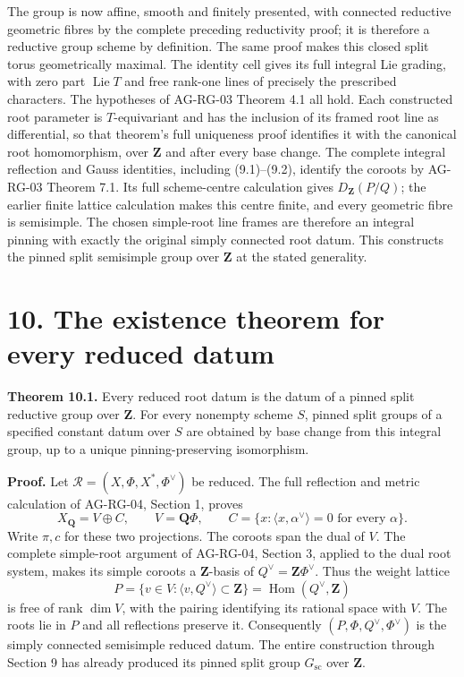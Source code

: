 \documentclass[11pt,a4paper,openany]{report}
\newcounter{none}
\begin{document}
The group is now affine, smooth and finitely presented, with connected reductive geometric fibres by the complete preceding reductivity proof; it is therefore a reductive group scheme by definition. The same proof makes this closed split torus geometrically maximal. The identity cell gives its full integral Lie grading, with zero part \(\operatorname{Lie}T\) and free rank-one lines of precisely the prescribed characters. The hypotheses of AG-RG-03 Theorem 4.1 all hold. Each constructed root parameter is \(T\)-equivariant and has the inclusion of its framed root line as differential, so that theorem's full uniqueness proof identifies it with the canonical root homomorphism, over \(\mathbf Z\) and after every base change. The complete integral reflection and Gauss identities, including (9.1)--(9.2), identify the coroots by AG-RG-03 Theorem 7.1. Its full scheme-centre calculation gives \(D_{\mathbf Z}(P/Q)\); the earlier finite lattice calculation makes this centre finite, and every geometric fibre is semisimple. The chosen simple-root line frames are therefore an integral pinning with exactly the original simply connected root datum. This constructs the pinned split semisimple group over \(\mathbf Z\) at the stated generality.

\section{10. The existence theorem for every reduced datum}\label{AG-RG-05-the-existence-theorem-for-every-reduced-datum}

\textbf{Theorem 10.1.} Every reduced root datum is the datum of a pinned split reductive group over \(\mathbf Z\). For every nonempty scheme \(S\), pinned split groups of a specified constant datum over \(S\) are obtained by base change from this integral group, up to a unique pinning-preserving isomorphism.

\textbf{Proof.} Let \(\mathcal R=(X,\Phi,X^*,\Phi^\vee)\) be reduced. The full reflection and metric calculation of AG-RG-04, Section 1, proves \[
 X_{\mathbf Q}=V\oplus C,\qquad
 V=\mathbf Q\Phi,\qquad
 C=\{x:\langle x,\alpha^\vee\rangle=0\text{ for every }\alpha\}.
\] Write \(\pi,c\) for these two projections. The coroots span the dual of \(V\). The complete simple-root argument of AG-RG-04, Section 3, applied to the dual root system, makes its simple coroots a \(\mathbf Z\)-basis of \(Q^\vee=\mathbf Z\Phi^\vee\). Thus the weight lattice \[
 P=\{v\in V:\langle v,Q^\vee\rangle\subset\mathbf Z\}
   =\operatorname{Hom}(Q^\vee,\mathbf Z)
\] is free of rank \(\dim V\), with the pairing identifying its rational space with \(V\). The roots lie in \(P\) and all reflections preserve it. Consequently \((P,\Phi,Q^\vee,\Phi^\vee)\) is the simply connected semisimple reduced datum. The entire construction through Section 9 has already produced its pinned split group \(G_{\mathrm{sc}}\) over \(\mathbf Z\).
\end{document}
